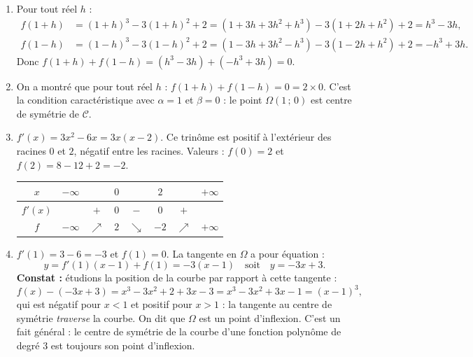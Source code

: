 \documentclass[11pt]{article}
\newcommand{\cle}[1]{{\popxbold\color{popdark}#1}}
\begin{document}
\begin{corrige}
\begin{enumerate}
\item Pour tout réel $h$ :
\begin{align*}
f(1+h)&=(1+h)^3-3(1+h)^2+2=(1+3h+3h^2+h^3)-3(1+2h+h^2)+2=h^3-3h,\\
f(1-h)&=(1-h)^3-3(1-h)^2+2=(1-3h+3h^2-h^3)-3(1-2h+h^2)+2=-h^3+3h.
\end{align*}
Donc $f(1+h)+f(1-h)=(h^3-3h)+(-h^3+3h)=0$.
\item On a montré que pour tout réel $h$ : $f(1+h)+f(1-h)=0=2\times 0$. C'est la condition caractéristique avec $\alpha=1$ et $\beta=0$ : le point $\boxed{\Omega(1\,;\,0)}$ est \cle{centre de symétrie} de $\mathscr{C}$.
\item $f'(x)=3x^2-6x=3x(x-2)$. Ce trinôme est positif à l'extérieur des racines $0$ et $2$, négatif entre les racines. Valeurs : $f(0)=2$ et $f(2)=8-12+2=-2$.
\begin{center}
\begin{tabular}{|c|ccccccc|}\hline
$x$ & $-\infty$ & & $0$ & & $2$ & & $+\infty$ \\ \hline
$f'(x)$ & & $+$ & $0$ & $-$ & $0$ & $+$ & \\ \hline
$f$ & $-\infty$ & $\nearrow$ & $2$ & $\searrow$ & $-2$ & $\nearrow$ & $+\infty$ \\ \hline
\end{tabular}
\end{center}
\item $f'(1)=3-6=-3$ et $f(1)=0$. La tangente en $\Omega$ a pour équation :
\[ y=f'(1)(x-1)+f(1)=-3(x-1) \quad\text{soit}\quad \boxed{y=-3x+3}. \]
\textbf{Constat :} étudions la position de la courbe par rapport à cette tangente :
\[ f(x)-(-3x+3)=x^3-3x^2+2+3x-3=x^3-3x^2+3x-1=(x-1)^3, \]
qui est négatif pour $x<1$ et positif pour $x>1$ : la tangente au centre de symétrie \emph{traverse} la courbe. On dit que $\Omega$ est un \cle{point d'inflexion}. C'est un fait général : le centre de symétrie de la courbe d'une fonction polynôme de degré $3$ est toujours son point d'inflexion.
\end{enumerate}
\end{corrige}
\end{document}
